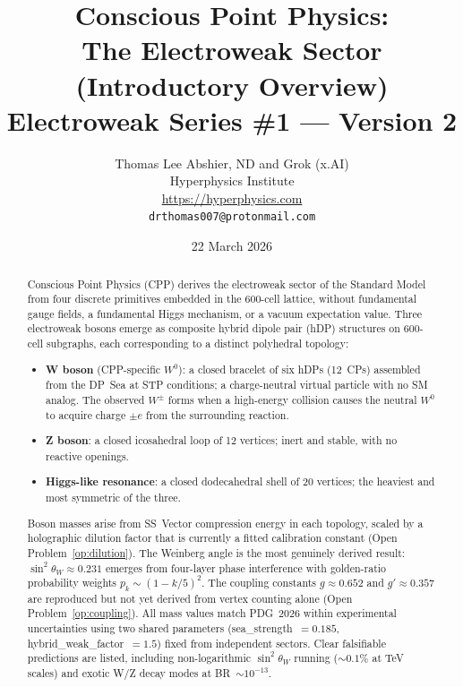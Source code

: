 \documentclass[11pt,a4paper]{article}
\title{\textbf{Conscious Point Physics:\\
The Electroweak Sector\\
(Introductory Overview)}\\[6pt]
{\large Electroweak Series \#1 --- Version 2}}
\author{Thomas Lee Abshier, ND and Grok (x.AI)\\
Hyperphysics Institute\\
\url{https://hyperphysics.com}\\
\texttt{drthomas007@protonmail.com}}
\date{22 March 2026}
\begin{document}
\maketitle

\begin{abstract}
Conscious Point Physics (CPP) derives the electroweak sector of the
Standard Model from four discrete primitives embedded in the 600-cell
lattice, without fundamental gauge fields, a fundamental Higgs
mechanism, or a vacuum expectation value.  Three electroweak bosons
emerge as composite hybrid dipole pair (hDP) structures on 600-cell
subgraphs, each corresponding to a distinct polyhedral topology:

\begin{itemize}
\item \textbf{W boson} (CPP-specific $W^0$): a closed bracelet of six
  hDPs (12~CPs) assembled from the DP~Sea at STP conditions; a
  charge-neutral virtual particle with no SM analog.  The observed
  $W^\pm$ forms when a high-energy collision causes the neutral $W^0$
  to acquire charge $\pm e$ from the surrounding reaction.
\item \textbf{Z boson}: a closed icosahedral loop of 12 vertices;
  inert and stable, with no reactive openings.
\item \textbf{Higgs-like resonance}: a closed dodecahedral shell of 20
  vertices; the heaviest and most symmetric of the three.
\end{itemize}

Boson masses arise from SS~Vector compression energy in each topology,
scaled by a holographic dilution factor that is currently a fitted
calibration constant (Open Problem~\ref{op:dilution}).  The Weinberg
angle is the most genuinely derived result: $\sin^2\theta_W \approx
0.231$ emerges from four-layer phase interference with golden-ratio
probability weights $p_k \sim (1-k/5)^2$.  The coupling
constants $g \approx 0.652$ and $g' \approx 0.357$ are reproduced but
not yet derived from vertex counting alone (Open
Problem~\ref{op:coupling}).  All mass values match PDG~2026 within
experimental uncertainties using two shared parameters
(sea\_strength~$= 0.185$, hybrid\_weak\_factor~$= 1.5$) fixed from
independent sectors.  Clear falsifiable predictions are listed,
including non-logarithmic $\sin^2\theta_W$ running ($\sim 0.1\%$ at
TeV scales) and exotic W/Z decay modes at BR~$\sim 10^{-13}$.
\end{abstract}

\tableofcontents
\newpage
\end{document}
